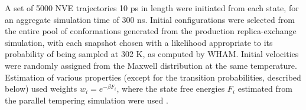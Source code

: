 
A set of 5000 NVE trajectories 10 ps in length were initiated from each state, for an aggregate simulation time of 300 ns.  
Initial configurations were selected from the entire pool of conformations generated from the production replica-exchange simulation, with each snapshot chosen with a likelihood appropriate to its probability of being sampled at 302 K, as computed by WHAM. 
Initial velocities were randomly assigned from the Maxwell distribution at the same temperature.  
Estimation of various properties (except for the transition probabilities, described below) used weights $w_i = e^{-\beta F_i}$, where the state free energies $F_i$ estimated from the parallel tempering simulation were used \cite{chodera:mms:2006}.

